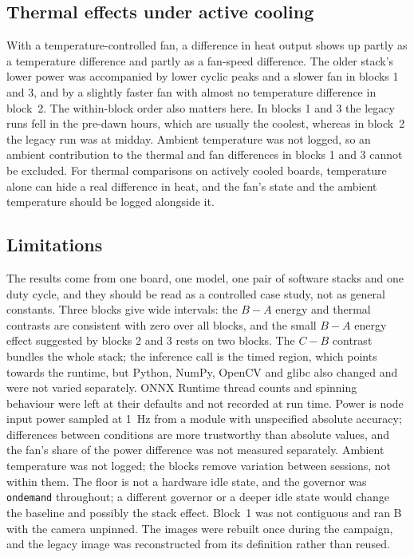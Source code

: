\documentclass[10pt,journal,compsoc]{IEEEtran}
\begin{document}
\subsection{Thermal effects under active cooling}
With a temperature-controlled fan, a difference in heat output shows up partly as a temperature difference and partly as a fan-speed difference. The older stack's lower power was accompanied by lower cyclic peaks and a slower fan in blocks 1 and 3, and by a slightly faster fan with almost no temperature difference in block~2. The within-block order also matters here. In blocks 1 and 3 the legacy runs fell in the pre-dawn hours, which are usually the coolest, whereas in block~2 the legacy run was at midday. Ambient temperature was not logged, so an ambient contribution to the thermal and fan differences in blocks 1 and 3 cannot be excluded. For thermal comparisons on actively cooled boards, temperature alone can hide a real difference in heat, and the fan's state and the ambient temperature should be logged alongside it.

\subsection{Limitations}
The results come from one board, one model, one pair of software stacks and one duty cycle, and they should be read as a controlled case study, not as general constants. Three blocks give wide intervals: the $B-A$ energy and thermal contrasts are consistent with zero over all blocks, and the small $B-A$ energy effect suggested by blocks 2 and 3 rests on two blocks. The $C-B$ contrast bundles the whole stack; the inference call is the timed region, which points towards the runtime, but Python, NumPy, OpenCV and glibc also changed and were not varied separately. ONNX Runtime thread counts and spinning behaviour were left at their defaults and not recorded at run time. Power is node input power sampled at 1~Hz from a module with unspecified absolute accuracy; differences between conditions are more trustworthy than absolute values, and the fan's share of the power difference was not measured separately. Ambient temperature was not logged; the blocks remove variation between sessions, not within them. The floor is not a hardware idle state, and the governor was \texttt{ondemand} throughout; a different governor or a deeper idle state would change the baseline and possibly the stack effect. Block~1 was not contiguous and ran B with the camera unpinned. The images were rebuilt once during the campaign, and the legacy image was reconstructed from its definition rather than reused.
\end{document}
